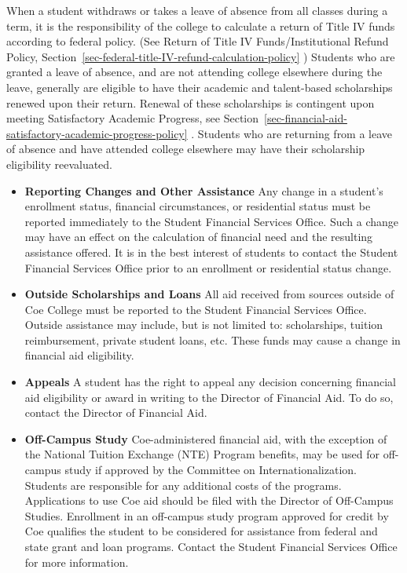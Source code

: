 \documentclass[
  letterpaper,
]{scrbook}
\begin{document}
When a student withdraws or takes a leave of absence from all classes
during a term, it is the responsibility of the college to calculate a
return of Title IV funds according to federal policy. (See Return of
Title IV Funds/Institutional Refund Policy,
Section~\ref{sec-federal-title-IV-refund-calculation-policy} ) Students
who are granted a leave of absence, and are not attending college
elsewhere during the leave, generally are eligible to have their
academic and talent-based scholarships renewed upon their return.
Renewal of these scholarships is contingent upon meeting Satisfactory
Academic Progress, see
Section~\ref{sec-financial-aid-satisfactory-academic-progress-policy} .
Students who are returning from a leave of absence and have attended
college elsewhere may have their scholarship eligibility reevaluated.

\begin{itemize}
\item
  \textbf{Reporting Changes and Other Assistance} Any change in a
  student's enrollment status, financial circumstances, or residential
  status must be reported immediately to the Student Financial Services
  Office. Such a change may have an effect on the calculation of
  financial need and the resulting assistance offered. It is in the best
  interest of students to contact the Student Financial Services Office
  prior to an enrollment or residential status change.
\item
  \textbf{Outside Scholarships and Loans} All aid received from sources
  outside of Coe College must be reported to the Student Financial
  Services Office. Outside assistance may include, but is not limited
  to: scholarships, tuition reimbursement, private student loans, etc.
  These funds may cause a change in financial aid eligibility.
\item
  \textbf{Appeals} A student has the right to appeal any decision
  concerning financial aid eligibility or award in writing to the
  Director of Financial Aid. To do so, contact the Director of Financial
  Aid.
\item
  \textbf{Off-Campus Study} Coe-administered financial aid, with the
  exception of the National Tuition Exchange (NTE) Program benefits, may
  be used for off-campus study if approved by the Committee on
  Internationalization. Students are responsible for any additional
  costs of the programs. Applications to use Coe aid should be filed
  with the Director of Off-Campus Studies. Enrollment in an off-campus
  study program approved for credit by Coe qualifies the student to be
  considered for assistance from federal and state grant and loan
  programs. Contact the Student Financial Services Office for more
  information.
\end{itemize}
\end{document}
